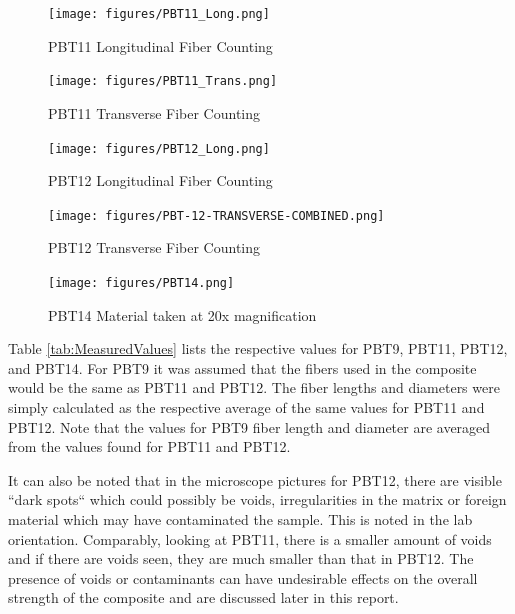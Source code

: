 \documentclass[11pt]{article}
\begin{document}
\begin{figure}[H]
\centering
\texttt{[image: figures/PBT11\_Long.png]}
\caption{PBT11 Longitudinal Fiber Counting}
\label{pbt11longcount}
\end{figure}
\begin{figure}[H]
\centering
\texttt{[image: figures/PBT11\_Trans.png]}
\caption{PBT11 Transverse Fiber Counting}
\label{pbt11transcount}
\end{figure}
\begin{figure}[H]
\centering
\texttt{[image: figures/PBT12\_Long.png]}
\caption{PBT12 Longitudinal Fiber Counting}
\label{pbt12longcount}
\end{figure}
\begin{figure}[H]
\centering
\texttt{[image: figures/PBT-12-TRANSVERSE-COMBINED.png]}
\caption{PBT12 Transverse Fiber Counting}
\label{pbt12transcount}
\end{figure}

\begin{figure}[H]
\centering
\texttt{[image: figures/PBT14.png]}
\caption{PBT14 Material taken at 20x magnification}
\label{pbt12longcount}
\end{figure}

Table \ref{tab:MeasuredValues} lists the respective values for PBT9, PBT11, PBT12, and PBT14. For PBT9 it was assumed that the fibers used in the composite would be the same as PBT11 and PBT12. The fiber lengths and diameters were simply calculated as the respective average of the same values for PBT11 and PBT12.  Note that the values for PBT9 fiber length and diameter are averaged from the values found for PBT11 and PBT12.

It can also be noted that in the microscope pictures for PBT12, there are visible ``dark spots`` which could possibly be voids, irregularities in the matrix or foreign material which may have contaminated the sample. This is noted in the lab orientation. Comparably, looking at PBT11, there is a smaller amount of voids and if there are voids seen, they are much smaller than that in PBT12. The presence of voids or contaminants can have undesirable effects on the overall strength of the composite and are discussed later in this report. 
\end{document}
